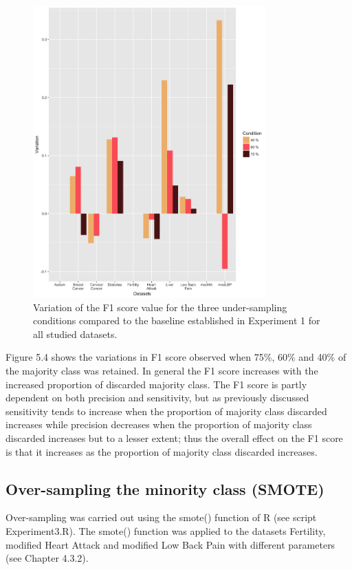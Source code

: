 \begin{figure}[!htbp]
    \centering
    \includegraphics[width=0.8\textwidth]{ThesisTemplate/usingLatex/chapter5Images/F1VariationUnderBySets.png}
    \caption{Variation of the F1 score value for the three under-sampling conditions compared to the baseline established in Experiment 1 for all studied datasets.}
    \label{fig:F1Var}
\end{figure}

Figure 5.4 shows the variations in F1 score observed when 75\%, 60\% and 40\% of the majority class was retained. In general the F1 score increases with the increased proportion of discarded majority class. The F1 score is partly dependent on both precision and sensitivity, but as previously discussed sensitivity tends to increase when the proportion of majority class discarded increases while precision decreases when the proportion of majority class discarded increases but to a lesser extent; thus the overall effect on the F1 score is that it increases as the proportion of majority class discarded increases.\newline

\subsection{Over-sampling the minority class (SMOTE)}
Over-sampling was carried out using the smote() function of R (see script Experiment3.R).\newline
The smote() function was applied to the datasets Fertility, modified Heart Attack and modified Low Back Pain with different parameters (see Chapter 4.3.2). 

